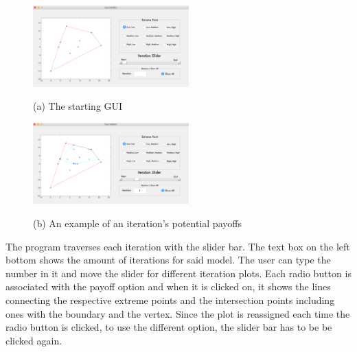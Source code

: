 \documentclass{article}
\begin{document}
\begin{figure}[htb]
\begin{minipage}[b]{1\linewidth}
  \centering
  \centerline{\includegraphics[width=6cm]{GUI1}}
  \centerline{(a) The starting GUI}\medskip
\end{minipage}
\hfill
\begin{minipage}[b]{1\linewidth}
  \centering
  \centerline{\includegraphics[width=6cm]{GUI2}}
  \centerline{(b)  An example of an iteration's potential payoffs}\medskip
\end{minipage}
\hfill
\end{figure}
The program traverses each iteration with the slider bar. The text box on the left bottom shows the amount of iterations for said model. The user can type the number in it and move the slider for different iteration plots. Each radio button is associated with the payoff option and when it is clicked on, it shows the lines connecting the respective extreme points and the intersection points including ones with the boundary and the vertex. Since the plot is reassigned each time the radio button is clicked, to use the different option, the slider bar has to be be clicked again.
\end{document}
